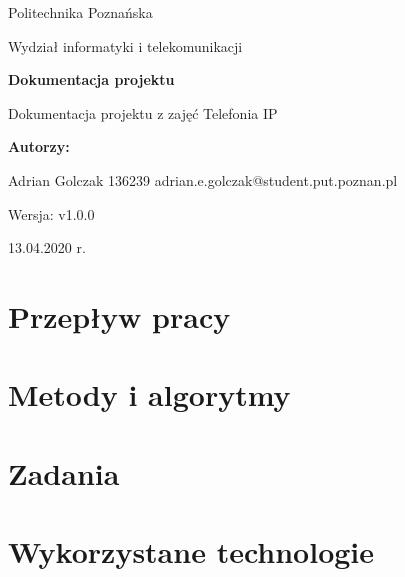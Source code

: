 \documentclass{article}
\newcommand{\version}{v1.0.0}
\begin{document}
\begin{titlepage}
		\begin{center}
			
						\LARGE
			Politechnika Poznańska
			
			\vspace{0.3cm}
			
			\large
			Wydział informatyki i telekomunikacji
			
			\vspace{3.0cm}
			\huge
			\textbf{Dokumentacja projektu}
			
			\vspace{0.5cm}
			
			\large
			Dokumentacja projektu z zajęć Telefonia IP
			
			\vspace{2.4cm}
			
			\LARGE
			\textbf{Autorzy:}
			
			\vspace{0.3cm}
			
			Adrian Golczak 136239
			adrian.e.golczak@student.put.poznan.pl
			
			\vspace{0.3cm}

			\vfill
			
			\normalsize
			Wersja: \version
			
			\vspace{2cm}
			

			
			13.04.2020 r.
			
		\end{center}
\end{titlepage}
\tableofcontents
\newpage
	\section{Przepływ pracy}
	
	\section{Metody i algorytmy}
	
	\section{Zadania}
	
	\section{Wykorzystane technologie}
	
\end{document}
